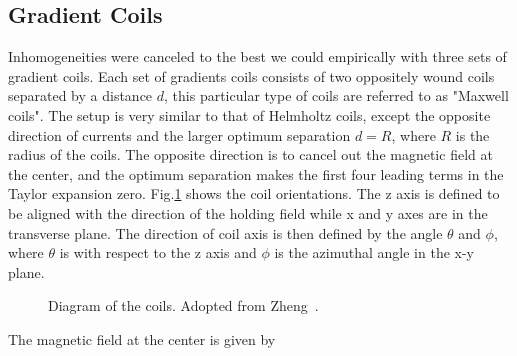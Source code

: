 \subsection{Gradient Coils}

Inhomogeneities were canceled to the best we could empirically with three sets of gradient coils. Each set of gradients coils consists of two oppositely wound coils separated by a distance $d$, this particular type of coils are referred to as "Maxwell coils". The setup is very similar to that of Helmholtz coils, except the opposite direction of currents and the larger optimum separation $d=R$, where $R$ is the radius of the coils. The opposite direction is to cancel out the magnetic field at the center, and the optimum separation makes the first four leading terms in the Taylor expansion zero\cite{Callaghan}. Fig.\ref{gradient_coils} shows the coil orientations. The z axis is defined to be aligned with the direction of the holding field while x and y axes are in the transverse plane. The direction of coil axis is then defined by the angle $\theta$ and $\phi$, where $\theta$ is with respect to the z axis and $\phi$ is the azimuthal angle in the x-y plane.

\begin{figure}[t!]
	\centering
	\caption{{Diagram of the coils. Adopted from Zheng~\cite{YuanThesis}.}}
	\label{gradient_coils}
\end{figure}

The magnetic field at the center is given by\cite{PhysRevA.37.2877}

